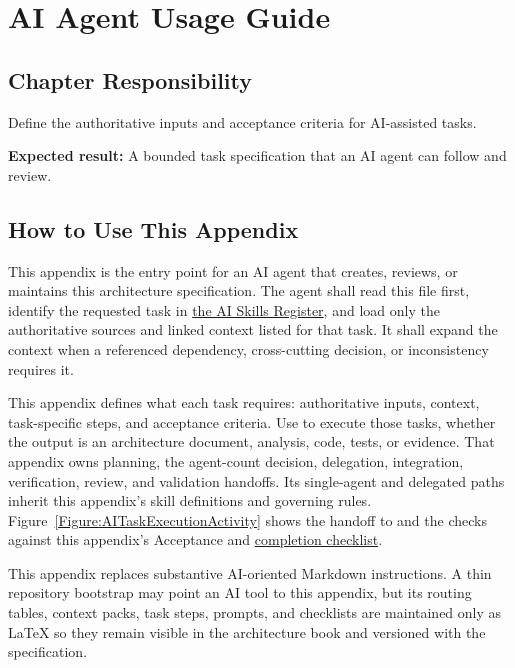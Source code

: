 \chapter{AI Agent Usage Guide}

\section{Chapter Responsibility}
\label{Section:AIAgentGuideResponsibility}
Define the authoritative inputs and acceptance criteria for AI-assisted tasks.

\noindent\textbf{Expected result:} A bounded task specification that an AI agent can follow and review.

\section{How to Use This Appendix}
This appendix is the entry point for an AI agent that creates, reviews, or
maintains this architecture specification. The agent shall read this file
first, identify the requested task in
\hyperref[Table:AISkills]{the AI Skills Register}, and load only the
authoritative sources and linked context listed for that task. It shall expand the context when a
referenced dependency, cross-cutting decision, or inconsistency requires it.

This appendix defines what each task requires: authoritative inputs,
context, task-specific steps, and acceptance criteria. Use
 to execute those tasks, whether the
output is an architecture document, analysis, code, tests, or evidence. That
appendix owns planning, the agent-count decision, delegation, integration,
verification, review, and validation handoffs. Its single-agent and delegated
paths inherit this appendix's skill definitions and governing rules.
Figure~\ref{Figure:AITaskExecutionActivity} shows the handoff to
 and the checks against this appendix's
Acceptance and \hyperref[Table:AICompletionChecklist]{completion checklist}.

This appendix replaces substantive AI-oriented Markdown instructions. A thin
repository bootstrap may point an AI tool to this appendix, but its routing
tables, context packs, task steps, prompts, and checklists are maintained only
as LaTeX so they remain visible in the architecture book and versioned with the
specification.

